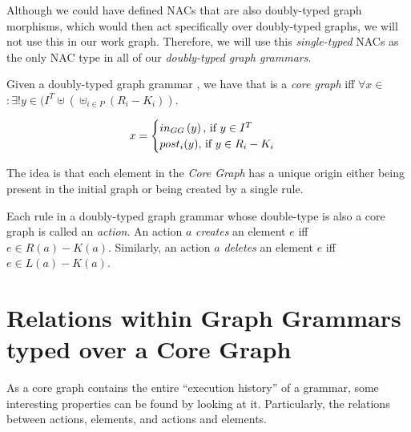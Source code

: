 \begin{remark}
  Although we could have defined NACs that are also doubly-typed graph morphisms, which would then act specifically over doubly-typed graphs, we will not use this in our work graph. Therefore, we will use this \emph{single-typed} NACs as the only NAC type in all of our \emph{doubly-typed graph grammars}.
\end{remark}

\begin{definition} Given a doubly-typed graph grammar \doublyTypedGraphGrammarCore{}, we have that \coreGraph{} is a \emph{core graph} iff \mbox{$\forall x \in$ \coreGraph $: \exists! y \in (I^T \uplus (\uplus_{i \in P} (R_i - K_i))$}.


\[ x =
    \begin{cases}
      in_{GG}\parens{y},$ if $y \in I^T\\
      post_i(y),$ if $y \in R_i - K_i\\
    \end{cases}
   \]

  \begin{intuition} The idea is that each element in the \emph{Core Graph} has a unique origin either being present in the initial graph or being created by a single rule.
\end{intuition}

  Each rule in a doubly-typed graph grammar whose double-type is also a core graph is called an \emph{action}. An action $a$ \emph{creates} an element $e$ iff $e \in R(a) - K(a)$. Similarly, an action $a$ \emph{deletes} an element $e$ iff $e \in L(a) - K(a)$.

\end{definition}

\section{Relations within Graph Grammars typed over a Core Graph}


As a core graph contains the entire ``execution history'' of a grammar, some interesting properties can be found by looking at it. Particularly, the relations between actions, elements, and actions and elements.

